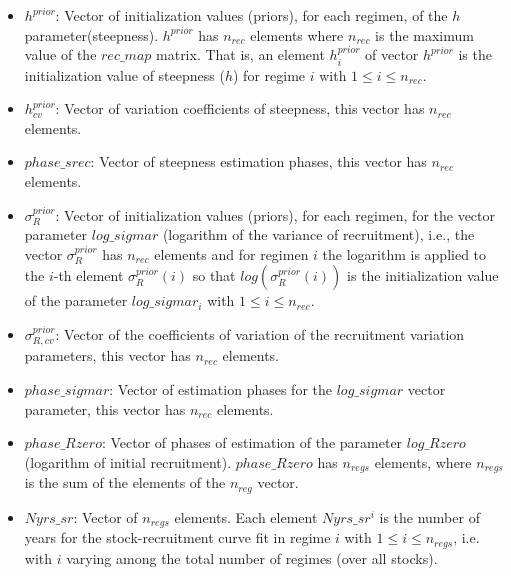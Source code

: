 \documentclass{article}
\begin{document}
\begin{itemize}
    \item $h^{prior}$: Vector of initialization values (priors), for each regimen, of the $h$ parameter(steepness). $h^{prior}$ has $n_{rec}$ elements where $n_{rec}$ is the maximum value of the $rec\_map$ matrix. That is, an element $h^{prior}_i$ of vector $h^{prior}$ is the initialization value of steepness ($h$) for regime $i$ with $1\leq i \leq n_{rec}$.
    \item $h^{prior}_{cv}$: Vector of variation coefficients of steepness, this vector has  $n_{rec}$ elements.
    \item $phase\_srec$: Vector of steepness estimation phases, this vector has  $n_{rec}$ elements.
    \item $\sigma_{R}^{prior}$: Vector of initialization values (priors), for each regimen, for the vector parameter $log\_sigmar$ (logarithm of the variance of recruitment), i.e., the vector $\sigma_{R}^{prior}$ has $n_{rec}$ elements and for regimen $i$ the logarithm is applied to the  $i$-th element ${\sigma_{R}^{prior}(i)}$  so that $log({\sigma_{R}^{prior}}(i))$ is the initialization value of the parameter $log\_sigmar_i$ with $1\leq i \leq n_{rec}$.
    \item $\sigma_{R,cv}^{prior}$: Vector of the coefficients of variation of the recruitment variation parameters, this vector has $n_{rec}$ elements.
    \item $phase\_sigmar$: Vector of estimation phases for the $log\_sigmar$ vector parameter, this vector has  $n_{rec}$ elements. 
    \item $phase\_Rzero$: Vector of phases of estimation of the parameter $log\_Rzero$ (logarithm of initial recruitment). $phase\_Rzero$ has $n_{regs}$ elements, where $n_{regs}$ is the sum of the elements of the $n_{reg}$ vector.
    \item $Nyrs\_sr$: Vector of $n_{regs}$ elements. Each element $Nyrs\_sr^i$ is the number of years for the stock-recruitment curve fit in regime $i$ with $1 \leq i \leq n_{regs}$, i.e. with $i$ varying among the total number of regimes (over all stocks).

\end{itemize}
\end{document}
